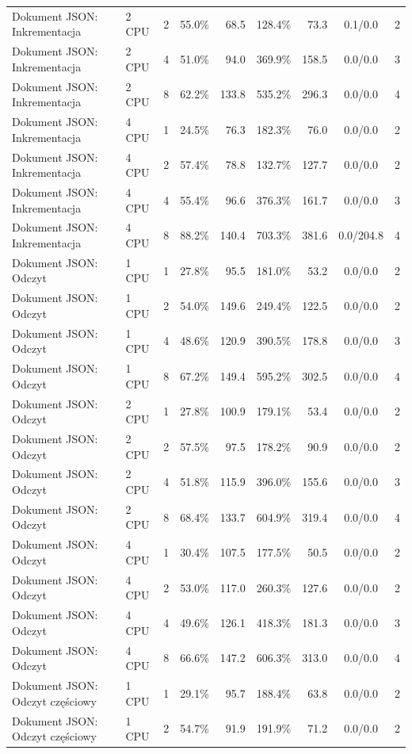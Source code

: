 \begin{table}[ht]
{\begin{tabular}{llcrrrrcc}
Dokument JSON: Inkrementacja & 2 CPU & 2 & 55.0\% & 68.5 & 128.4\% & 73.3 & 0.1/0.0 & 2 \\
Dokument JSON: Inkrementacja & 2 CPU & 4 & 51.0\% & 94.0 & 369.9\% & 158.5 & 0.0/0.0 & 3 \\
Dokument JSON: Inkrementacja & 2 CPU & 8 & 62.2\% & 133.8 & 535.2\% & 296.3 & 0.0/0.0 & 4 \\
Dokument JSON: Inkrementacja & 4 CPU & 1 & 24.5\% & 76.3 & 182.3\% & 76.0 & 0.0/0.0 & 2 \\
Dokument JSON: Inkrementacja & 4 CPU & 2 & 57.4\% & 78.8 & 132.7\% & 127.7 & 0.0/0.0 & 2 \\
Dokument JSON: Inkrementacja & 4 CPU & 4 & 55.4\% & 96.6 & 376.3\% & 161.7 & 0.0/0.0 & 3 \\
Dokument JSON: Inkrementacja & 4 CPU & 8 & 88.2\% & 140.4 & 703.3\% & 381.6 & 0.0/204.8 & 4 \\
Dokument JSON: Odczyt & 1 CPU & 1 & 27.8\% & 95.5 & 181.0\% & 53.2 & 0.0/0.0 & 2 \\
Dokument JSON: Odczyt & 1 CPU & 2 & 54.0\% & 149.6 & 249.4\% & 122.5 & 0.0/0.0 & 2 \\
Dokument JSON: Odczyt & 1 CPU & 4 & 48.6\% & 120.9 & 390.5\% & 178.8 & 0.0/0.0 & 3 \\
Dokument JSON: Odczyt & 1 CPU & 8 & 67.2\% & 149.4 & 595.2\% & 302.5 & 0.0/0.0 & 4 \\
Dokument JSON: Odczyt & 2 CPU & 1 & 27.8\% & 100.9 & 179.1\% & 53.4 & 0.0/0.0 & 2 \\
Dokument JSON: Odczyt & 2 CPU & 2 & 57.5\% & 97.5 & 178.2\% & 90.9 & 0.0/0.0 & 2 \\
Dokument JSON: Odczyt & 2 CPU & 4 & 51.8\% & 115.9 & 396.0\% & 155.6 & 0.0/0.0 & 3 \\
Dokument JSON: Odczyt & 2 CPU & 8 & 68.4\% & 133.7 & 604.9\% & 319.4 & 0.0/0.0 & 4 \\
Dokument JSON: Odczyt & 4 CPU & 1 & 30.4\% & 107.5 & 177.5\% & 50.5 & 0.0/0.0 & 2 \\
Dokument JSON: Odczyt & 4 CPU & 2 & 53.0\% & 117.0 & 260.3\% & 127.6 & 0.0/0.0 & 2 \\
Dokument JSON: Odczyt & 4 CPU & 4 & 49.6\% & 126.1 & 418.3\% & 181.3 & 0.0/0.0 & 3 \\
Dokument JSON: Odczyt & 4 CPU & 8 & 66.6\% & 147.2 & 606.3\% & 313.0 & 0.0/0.0 & 4 \\
Dokument JSON: Odczyt częściowy & 1 CPU & 1 & 29.1\% & 95.7 & 188.4\% & 63.8 & 0.0/0.0 & 2 \\
Dokument JSON: Odczyt częściowy & 1 CPU & 2 & 54.7\% & 91.9 & 191.9\% & 71.2 & 0.0/0.0 & 2 \\

\end{tabular}}
\end{table}
